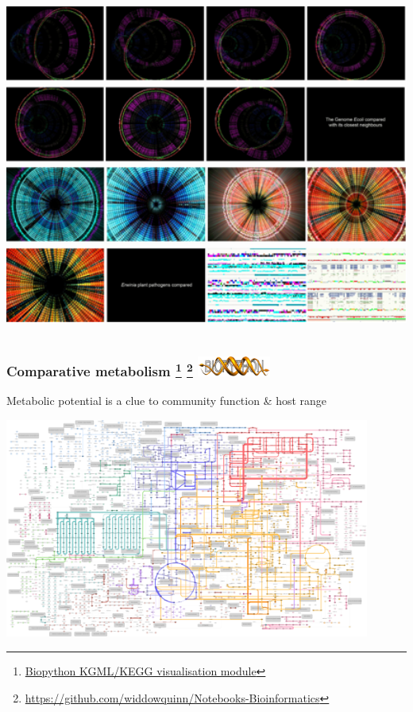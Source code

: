 \begin{frame}
\begin{columns}[T]
\begin{column}{3.5cm}
      \includegraphics[width=1\textwidth]{images/sciart3}
    \end{column}  
  \end{columns}
\end{frame}

\begin{frame}
  \frametitle{Comparative metabolism
    \footnote{\tiny{\href{https://github.com/widdowquinn/notebooks/blob/master/Biopython_KGML_intro.ipynb}{Biopython KGML/KEGG visualisation module}}}
    \footnote{\tiny{\href{https://github.com/widdowquinn/Notebooks-Bioinformatics}{https://github.com/widdowquinn/Notebooks-Bioinformatics}}}
    \includegraphics[width=0.18\textwidth]{images/biopython}
  }
  \textcolor{hutton_green}{Metabolic potential is a clue to community function \& host range}
  \begin{center}
    \includegraphics[width=0.9\textwidth]{images/dickeya_pathways}
  \end{center}
\end{frame}

